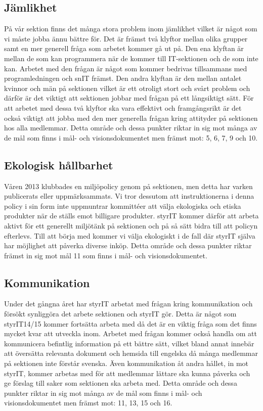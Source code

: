 \documentclass[11pt, includeaddress]{classes/cthit}
\begin{document}
\subsection{Jämlikhet}
På vår sektion finns det många stora problem inom jämlikhet vilket är något som vi måste jobba ännu bättre för. Det är främst två klyftor mellan olika grupper samt en mer generell fråga som arbetet kommer gå ut på. Den ena klyftan är mellan de som kan programmera när de kommer till IT-sektionen och de som inte kan. Arbetet med den frågan är något som kommer bedrivas tillsammans med programledningen och snIT främst. Den andra klyftan är den mellan antalet kvinnor och män på sektionen vilket är ett otroligt stort och svårt problem och därför är det viktigt att sektionen jobbar med frågan på ett långsiktigt sätt. För att arbetet med dessa två klyftor ska vara effektivt och framgångsrikt är det också viktigt att jobba med den mer generella frågan kring attityder på sektionen hos alla medlemmar.
\newline
\newline
Detta område och dessa punkter riktar in sig mot många av de mål som finns i mål- och visionsdokumentet men främst mot: 5, 6, 7, 9 och 10.

\subsection{Ekologisk hållbarhet}
Våren 2013 klubbades en miljöpolicy genom på sektionen, men detta har varken publicerats eller uppmärksammats. Vi tror dessutom att instruktionerna i denna policy i sin form inte uppmuntrar kommittéer att välja ekologiska och etiska produkter när de ställs emot billigare produkter. styrIT kommer därför att arbeta aktivt för ett generellt miljötänk på sektionen och på så sätt bidra till att policyn efterlevs. Till att börja med kommer vi välja ekologiskt i de fall där styrIT själva har möjlighet att påverka diverse inköp.
\newline
\newline
Detta område och dessa punkter riktar främst in sig mot mål 11 som finns i mål- och visionsdokumentet.

\subsection{Kommunikation}
Under det gångna året har styrIT arbetat med frågan kring kommunikation och försökt synliggöra det arbete sektionen och styrIT gör. Detta är något som styrIT14/15 kommer fortsätta arbeta med då det är en viktig fråga som det finns mycket kvar att utveckla inom. Arbetet med frågan kommer också handla om att kommunicera befintlig information på ett bättre sätt, vilket bland annat innebär att översätta relevanta dokument och hemsida till engelska då många medlemmar på sektionen inte förstår svenska. Även kommunikation åt andra hållet, in mot styrIT, kommer arbetas med för att medlemmar lättare ska kunna påverka och ge förslag till saker som sektionen ska arbeta med.
\newline
\newline
Detta område och dessa punkter riktar in sig mot många av de mål som finns i mål- och visionsdokumentet men främst mot: 11, 13, 15 och 16.
\end{document}
